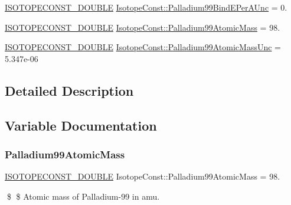 \begin{DoxyCompactItemize}
\mbox{\hyperlink{group___isotope_const-_macros_ga8f45a7272ce02c0b4c65c44636ed719a}{I\+S\+O\+T\+O\+P\+E\+C\+O\+N\+S\+T\+\_\+\+D\+O\+U\+B\+LE}} \mbox{\hyperlink{group___isotope_const-_palladium-_pd99_ga7d9a3ae61651bffdb8ea0464d2d9c964}{Isotope\+Const\+::\+Palladium99\+Bind\+E\+Per\+A\+Unc}} = 0.
\item 
\mbox{\hyperlink{group___isotope_const-_macros_ga8f45a7272ce02c0b4c65c44636ed719a}{I\+S\+O\+T\+O\+P\+E\+C\+O\+N\+S\+T\+\_\+\+D\+O\+U\+B\+LE}} \mbox{\hyperlink{group___isotope_const-_palladium-_pd99_ga269bd2e7cacfa9b2397f33eccbfc57b8}{Isotope\+Const\+::\+Palladium99\+Atomic\+Mass}} = 98.
\item 
\mbox{\hyperlink{group___isotope_const-_macros_ga8f45a7272ce02c0b4c65c44636ed719a}{I\+S\+O\+T\+O\+P\+E\+C\+O\+N\+S\+T\+\_\+\+D\+O\+U\+B\+LE}} \mbox{\hyperlink{group___isotope_const-_palladium-_pd99_gaf7272a472c7cbde4f16de12f958c01fd}{Isotope\+Const\+::\+Palladium99\+Atomic\+Mass\+Unc}} = 5.\+347e-\/06
\end{DoxyCompactItemize}


\subsection{Detailed Description}


\subsection{Variable Documentation}
\mbox{\label{group___isotope_const-_palladium-_pd99_ga269bd2e7cacfa9b2397f33eccbfc57b8}} 
\subsubsection{\texorpdfstring{Palladium99\+Atomic\+Mass}{Palladium99AtomicMass}}
{\footnotesize\ttfamily \mbox{\hyperlink{group___isotope_const-_macros_ga8f45a7272ce02c0b4c65c44636ed719a}{I\+S\+O\+T\+O\+P\+E\+C\+O\+N\+S\+T\+\_\+\+D\+O\+U\+B\+LE}} Isotope\+Const\+::\+Palladium99\+Atomic\+Mass = 98.}

\$ \$ Atomic mass of Palladium-\/99 in amu. \mbox{\label{group___isotope_const-_palladium-_pd99_gaf7272a472c7cbde4f16de12f958c01fd}} 
